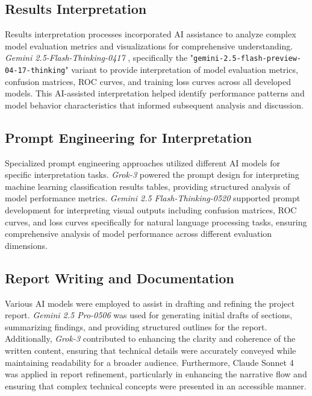 \subsection{Results Interpretation}

Results interpretation processes incorporated AI assistance to analyze complex model evaluation metrics and visualizations for comprehensive understanding. \textit{Gemini 2.5-Flash-Thinking-0417} \parencite{Doshi_2025}, specifically the "\texttt{gemini-2.5-flash-preview-04-17-thinking}" variant to provide interpretation of model evaluation metrics, confusion matrices, ROC curves, and training loss curves across all developed models. This AI-assisted interpretation helped identify performance patterns and model behavior characteristics that informed subsequent analysis and discussion.

\subsection{Prompt Engineering for Interpretation}

Specialized prompt engineering approaches utilized different AI models for specific interpretation tasks. \textit{Grok-3} \parencite{xGrokBeta} powered the prompt design for interpreting machine learning classification results tables, providing structured analysis of model performance metrics. \textit{Gemini 2.5 Flash-Thinking-0520} \parencite{Doshi_2025} supported prompt development for interpreting visual outputs including confusion matrices, ROC curves, and loss curves specifically for natural language processing tasks, ensuring comprehensive analysis of model performance across different evaluation dimensions.

\subsection{Report Writing and Documentation}

Various AI models were employed to assist in drafting and refining the project report. \textit{Gemini 2.5 Pro-0506} \parencite{2025geminipro} was used for generating initial drafts of sections, summarizing findings, and providing structured outlines for the report. Additionally, \textit{Grok-3} \parencite{xGrokBeta} contributed to enhancing the clarity and coherence of the written content, ensuring that technical details were accurately conveyed while maintaining readability for a broader audience. Furthermore, Claude Sonnet 4 \parencite{claude4} was applied in report refinement, particularly in enhancing the narrative flow and ensuring that complex technical concepts were presented in an accessible manner.


